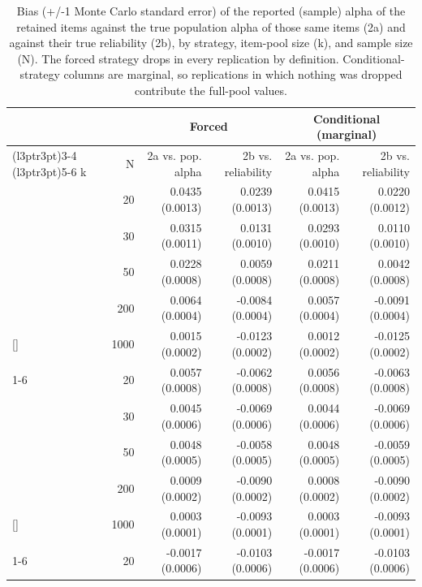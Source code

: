 \documentclass[
  nonatbib,
  authoryear,
  preprint]{elsarticle}
\begin{document}
\begin{longtable}[t]{lrrrrr}

\caption{\label{tbl-bias}Bias (+/-1 Monte Carlo standard error) of the
reported (sample) alpha of the retained items against the true
population alpha of those same items (2a) and against their true
reliability (2b), by strategy, item-pool size (k), and sample size (N).
The forced strategy drops in every replication by definition.
Conditional-strategy columns are marginal, so replications in which
nothing was dropped contribute the full-pool values.}

\tabularnewline

\toprule
\multicolumn{2}{c}{ } & \multicolumn{2}{c}{Forced} & \multicolumn{2}{c}{Conditional (marginal)} \\
\cmidrule(l{3pt}r{3pt}){3-4} \cmidrule(l{3pt}r{3pt}){5-6}
k & N & 2a vs. pop. alpha & 2b vs. reliability & 2a vs. pop. alpha & 2b vs. reliability\\
\midrule
 & 20 & 0.0435 (0.0013) & 0.0239 (0.0013) & 0.0415 (0.0013) & 0.0220 (0.0012)\\
\nopagebreak
 & 30 & 0.0315 (0.0011) & 0.0131 (0.0010) & 0.0293 (0.0010) & 0.0110 (0.0010)\\
\nopagebreak
 & 50 & 0.0228 (0.0008) & 0.0059 (0.0008) & 0.0211 (0.0008) & 0.0042 (0.0008)\\
\nopagebreak
 & 200 & 0.0064 (0.0004) & -0.0084 (0.0004) & 0.0057 (0.0004) & -0.0091 (0.0004)\\
\nopagebreak
\multirow[t]{-4}{*}[\normalbaselineskip]{\raggedright\arraybackslash 5} & 1000 & 0.0015 (0.0002) & -0.0123 (0.0002) & 0.0012 (0.0002) & -0.0125 (0.0002)\\
\cmidrule{1-6}\pagebreak[0]
 & 20 & 0.0057 (0.0008) & -0.0062 (0.0008) & 0.0056 (0.0008) & -0.0063 (0.0008)\\
\nopagebreak
 & 30 & 0.0045 (0.0006) & -0.0069 (0.0006) & 0.0044 (0.0006) & -0.0069 (0.0006)\\
\nopagebreak
 & 50 & 0.0048 (0.0005) & -0.0058 (0.0005) & 0.0048 (0.0005) & -0.0059 (0.0005)\\
\nopagebreak
 & 200 & 0.0009 (0.0002) & -0.0090 (0.0002) & 0.0008 (0.0002) & -0.0090 (0.0002)\\
\nopagebreak
\multirow[t]{-4}{*}[\normalbaselineskip]{\raggedright\arraybackslash 10} & 1000 & 0.0003 (0.0001) & -0.0093 (0.0001) & 0.0003 (0.0001) & -0.0093 (0.0001)\\
\cmidrule{1-6}\pagebreak[0]
 & 20 & -0.0017 (0.0006) & -0.0103 (0.0006) & -0.0017 (0.0006) & -0.0103 (0.0006)\\

\end{longtable}
\end{document}
